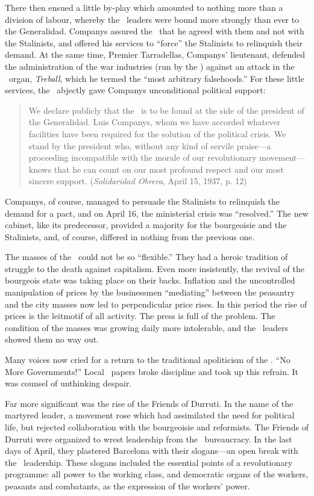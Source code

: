 There then ensued a little by-play which amounted to nothing more than a division of labour, whereby the \CNT\ leaders were bound more strongly than ever to the Generalidad. Companys assured the \CNT\ that he agreed with them and not with the Stalinists, and offered his services to ``force'' the Stalinists to relinquish their demand. At the same time, Premier Tarradellas, Companys’ lieutenant, defended the administration of the war industries (run by the \CNT) against an attack in the \PSUC\ organ, \emph{Treball}, which he termed the ``most arbitrary falsehoods.'' For these little services, the \CNT\ abjectly gave Companys unconditional political support:

\begin{quotation}
  We declare publicly that the \CNT\ is to be found at the side of the president of the Generalidad. Luis Companys, whom we have accorded whatever facilities have been required for the solution of the political crisis. We stand by the president who, without any kind of servile praise---a proceeding incompatible with the morale of our revolutionary movement---knows that he can count on our most profound respect and our most sincere support. (\emph{Solidaridad Obrera}, April 15, 1937, p. 12)
\end{quotation}

Companys, of course, managed to persuade the Stalinists to relinquish the demand for a pact, and on April 16, the ministerial crisis was ``resolved.'' The new cabinet, like its predecessor, provided a majority for the bourgeoisie and the Stalinists, and, of course, differed in nothing from the previous one.

The masses of the \CNT\ could not be so ``flexible.'' They had a heroic tradition of struggle to the death against capitalism. Even more insistently, the revival of the bourgeois state was taking place on their backs. Inflation and the uncontrolled manipulation of prices by the businessmen ``mediating'' between the peasantry and the city masses now led to perpendicular price rises. In this period the rise of prices is the leitmotif of all activity. The press is full of the problem. The condition of the masses was growing daily more intolerable, and the \CNT\ leaders showed them no way out.

Many voices now cried for a return to the traditional apoliticism of the \CNT. ``No More Governments!'' Local \CNT\ papers broke discipline and took up this refrain. It was counsel of unthinking despair.

Far more significant was the rise of the Friends of Durruti. In the name of the martyred leader, a movement rose which had assimilated the need for political life, but rejected collaboration with the bourgeoisie and reformists. The Friends of Durruti were organized to wrest leadership from the \CNT\ bureaucracy. In the last days of April, they plastered Barcelona with their slogans---an open break with the \CNT\ leadership. These slogans included the essential points of a revolutionary programme: all power to the working class, and democratic organs of the workers, peasants and combatants, as the expression of the workers’ power.

